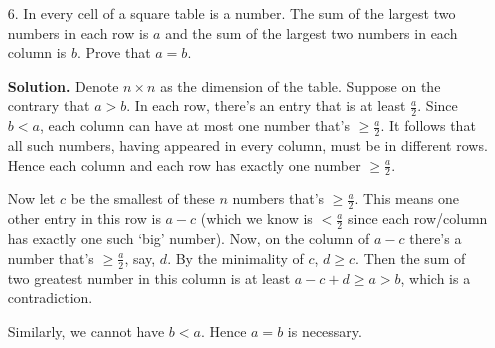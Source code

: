 \documentclass[11pt,a4paper]{article}
\begin{document}
\begin{enumerate}
\begin{enumerate}
		\item 
	\end{enumerate}
	
	\item [6.] In every cell of a square table is a number. The sum of the largest two numbers in each row
	is $a$ and the sum of the largest two numbers in each column is $b$. Prove that $a = b$.
	
	\textbf{Solution.} Denote $n\times n$ as the dimension of the table. Suppose on the contrary that $a>b$. In each row, there's an entry that is at least $\frac{a}{2}$. Since $b<a$, each column can have at most one number that's $\ge \frac{a}{2}$. It follows that all such numbers, having appeared in every column, must be in different rows. Hence each column and each row has exactly one number $\ge\frac{a}{2}$. 
	
	Now let $c$ be the smallest of these $n$ numbers that's $\ge\frac{a}{2}$. This means one other entry in this row is $a-c$ (which we know is $<\frac{a}{2}$ since each row/column has exactly one such `big' number). Now, on the column of $a-c$ there's a number that's $\ge\frac{a}{2}$, say, $d$. By the minimality of $c$, $d\ge c$. Then the sum of two greatest number in this column is at least $a-c+d\ge a>b$, which is a contradiction. 
	
	Similarly, we cannot have $b<a$. Hence $a=b$ is necessary. 
\end{enumerate}
\end{document}
